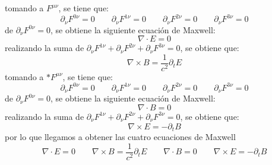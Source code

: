\documentclass[12pt,letterpaper]{report}
\begin{document}
tomando a $F^{\mu \nu}$, se tiene que:
\begin{equation*}
    \partial_\nu F^{0 \nu} = 0 \qquad \partial_\nu F^{1 \nu} = 0 \qquad \partial_\nu F^{2 \nu} = 0 \qquad \partial_\nu F^{3 \nu} = 0
\end{equation*}
de $\partial_\nu F^{0 \nu} = 0$, se obtiene la siguiente ecuación de Maxwell:
\begin{equation*}
    \nabla \cdot E = 0
\end{equation*}
realizando la suma de $\partial_\nu F^{1 \nu} +\partial_\nu F^{2 \nu}+\partial_\nu F^{3 \nu}=0$, se obtiene que:
\begin{equation*}
    \nabla \times B = \frac{1}{c^2}\partial_t E
\end{equation*}
tomando a $*F^{\mu \nu}$, se tiene que:
\begin{equation*}
    \partial_\nu F^{0 \nu} = 0 \qquad \partial_\nu F^{1 \nu} = 0 \qquad \partial_\nu F^{2 \nu} = 0 \qquad \partial_\nu F^{3 \nu} = 0
\end{equation*}
de $\partial_\nu F^{0 \nu} = 0$, se obtiene la siguiente ecuación de Maxwell:
\begin{equation*}
    \nabla \cdot B = 0
\end{equation*}
realizando la suma de $\partial_\nu F^{1 \nu} +\partial_\nu F^{2 \nu}+\partial_\nu F^{3 \nu}=0$, se obtiene que:
\begin{equation*}
    \nabla \times E = -\partial_t B
\end{equation*}
por lo que llegamos a obtener las cuatro ecuaciones de Maxwell
\begin{equation*}
    \nabla \cdot E = 0  \qquad 
    \nabla \times B = \frac{1}{c^2}\partial_t E  \qquad
    \nabla \cdot B = 0 \qquad
    \nabla \times E = -\partial_t B
\end{equation*}
\end{document}
